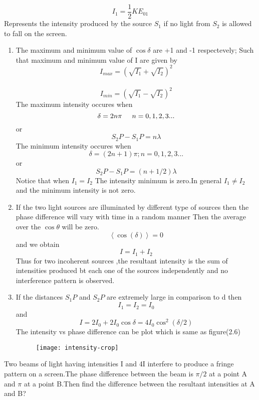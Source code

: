 $$I_1=\frac{1}{2}KE_{01}$$
Represents the intensity produced by the source $S_1$ if no light from $S_2$ is allowed to fall on the screen.\\
\begin{note}
	\begin{enumerate}
		\item The maximum and minimum value of $\cos\delta$ are +1 and -1 respectevely;
		Such that maximum and minimum value of I are given by \\
		$$I_{max}=(\sqrt{I_1}+\sqrt{I_2})^2$$\\
		$$I_{min}=(\sqrt{I_1}-\sqrt{I_2})^2$$
		The maximum intensity occures when \\
		$$\delta =2n\pi \hspace{0.5cm} n=0,1,2,3...$$
		or $$S_2P-S_1P=n\lambda$$
		The minimum intensity occures when 
		$$\delta=(2n+1)\pi;n=0,1,2,3...$$
		or
		$$S_2P-S_1P=\left( n+1/2\right) \lambda$$ 
		Notice that when $I_1=I_2$ The intensity minimum is zero.In general $I_1\neq I_2$ and the minimum intensity is not zero.     
		\item If the two light sources are illuminated by different type of sources then the phase difference will vary with time in a random manner Then the average over the $\cos \theta$ will be zero.\\
		$$\left\langle\cos (\delta)\right\rangle=0$$ 
		and we obtain \\
		$$I=I_1+I_2$$
		Thus for two incoherent sources ,the resultant intensity is the sum of intensities produced bt each one of the sources independently and no interference pattern is observed.
		\item If the distances $S_1P$ and $S_2P$ are extremely large in comparison to d then\\
		$$I_1=I_2=I_0$$
		and $$I=2I_0+2I_0\cos \delta=4I_0\cos^2(\delta/2) $$ 
		The intensity vs phase difference can be plot which is same as figure(2.6) 
		\begin{figure}[H]
			\centering
			\texttt{[image: intensity-crop]}
			\caption{}
			\label{}
		\end{figure}
	\end{enumerate}
\end{note}
\begin{exercise}
	Two beams of light having intensities I and 4I interfere to produce a fringe pattern on a screen.The phase difference between the beam is $\pi/2$ at a point A and $\pi$ at a point B.Then find the difference between the resultant intensities at A and B?
\end{exercise}
